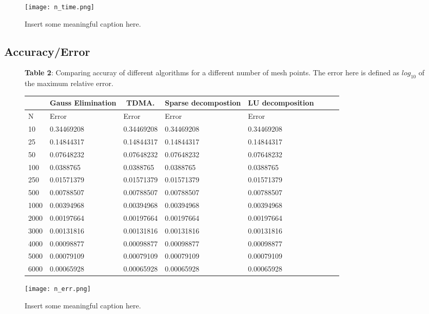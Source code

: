 \documentclass[11pt,a4paper,english,final]{article}
\numberwithin{equation}{section}
\begin{document}
\begin{figure}[h!]
\centering
  \texttt{[image: n\_time.png]}
  \caption{Insert some meaningful caption here. }
\end{figure}


\subsection{Accuracy/Error}

\begin{figure}
\textbf{Table 2}: Comparing accuray of different algorithms for a different number of mesh points. The error here is defined as $log_{10}$ of the maximum relative error. 

\begin{tabular}{|l|l|l|l|l|l|l|l|}
\hline
\multicolumn{1}{|c|}{ } & \multicolumn{1}{|c|}{Gauss Elimination} & \multicolumn{1}{|c|}{TDMA.} & \multicolumn{1}{|c|}{Sparse decompostion} & \multicolumn{1}{|c|}{LU decomposition}  \\
\hline
N & Error & Error & Error & Error  \\
\hline
10 & 0.34469208 &  0.34469208 &  0.34469208 &  0.34469208\\
25 & 0.14844317 &  0.14844317 &  0.14844317 &  0.14844317\\
50 & 0.07648232 &  0.07648232 &  0.07648232 &  0.07648232\\
100 & 0.0388765  &  0.0388765  &  0.0388765  &  0.0388765 \\
250 & 0.01571379 &  0.01571379 &  0.01571379 &  0.01571379\\
500 & 0.00788507 &  0.00788507 &  0.00788507 &  0.00788507\\
1000 & 0.00394968 &  0.00394968 &  0.00394968 &  0.00394968\\
2000 & 0.00197664 &  0.00197664 &  0.00197664 &  0.00197664\\
3000 & 0.00131816 &  0.00131816 &  0.00131816 &  0.00131816\\
4000 & 0.00098877 &  0.00098877 &  0.00098877 &  0.00098877\\
5000 & 0.00079109 &  0.00079109 &  0.00079109 &  0.00079109\\
6000 & 0.00065928 &  0.00065928 &  0.00065928 &  0.00065928\\
\hline
\end{tabular}
\end{figure}

\begin{figure}[h!]
\centering
  \texttt{[image: n\_err.png]}
  \caption{Insert some meaningful caption here. }
\end{figure}
\end{document}
